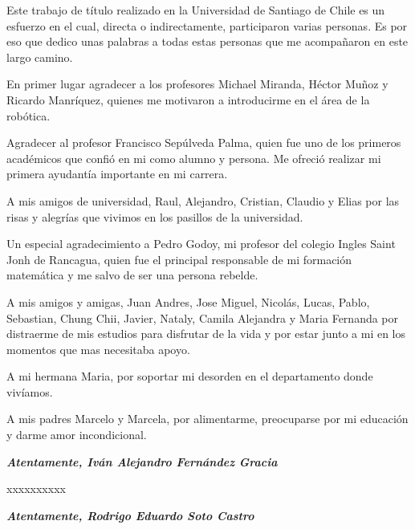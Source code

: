 \thispagestyle{fancy}

\vspace{5mm}

Este trabajo de título realizado en la Universidad de Santiago de Chile es un esfuerzo en el cual, directa o indirectamente, participaron varias personas. Es por eso que dedico unas palabras a todas estas personas que me acompañaron en este largo camino.

En primer lugar agradecer a los profesores Michael Miranda, Héctor Muñoz y Ricardo Manríquez, quienes me motivaron a introducirme en el área de la robótica.  

Agradecer  al profesor Francisco Sepúlveda Palma, quien fue uno de los primeros académicos que confió en mi como alumno y persona. Me ofreció realizar mi primera ayudantía importante en mi carrera.

A mis amigos de universidad, Raul, Alejandro, Cristian, Claudio y  Elias por las risas y alegrías que vivimos en los pasillos de la universidad.

Un especial agradecimiento a Pedro Godoy, mi profesor del colegio Ingles Saint Jonh de Rancagua, quien fue el principal responsable de mi formación matemática y me salvo de ser una persona rebelde.

A mis amigos y amigas, Juan Andres, Jose Miguel, Nicolás, Lucas, Pablo, Sebastian, Chung Chii, Javier, Nataly, Camila Alejandra y Maria Fernanda por distraerme de mis estudios para disfrutar de la vida y por estar junto a mi en los momentos que mas necesitaba apoyo.     

A mi hermana Maria, por soportar mi desorden en el departamento donde vivíamos. 

A mis padres Marcelo y Marcela, por alimentarme, preocuparse por mi educación y darme amor incondicional.


\begin{flushright}
{
{\sc \textbf{\textit{Atentamente, Iván Alejandro Fernández Gracia}}} \\
}
\end{flushright}

xxxxxxxxxx

\begin{flushright}
{
{\sc \textbf{\textit{Atentamente, Rodrigo Eduardo Soto Castro}}} \\
}
\end{flushright}